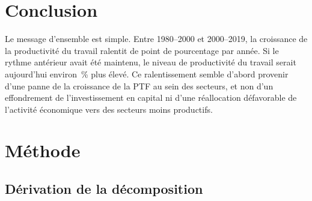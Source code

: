 \documentclass[11pt, letterpaper]{article}
\newcommand*\includetables[1]{}
\begin{document}
\includetables{note_lp_levels}


\section{Conclusion}

Le message d'ensemble est simple.
Entre 1980--2000 et 2000--2019, la croissance de la productivité du travail ralentit de \LPSlowdownMidLate{} point de pourcentage par année. Si le rythme antérieur avait été maintenu, le niveau de productivité du travail serait aujourd'hui environ \CounterfactualProductivityGapLate\,\% plus élevé. Ce ralentissement semble d'abord provenir d'une panne de la croissance de la PTF au sein des secteurs, et non d'un effondrement de l'investissement en capital ni d'une réallocation défavorable de l'activité économique vers des secteurs moins productifs.


\clearpage




\appendix
\renewcommand{\thesection}{\Alph{section}}

\section{Méthode}

\subsection{Dérivation de la décomposition}
\end{document}
